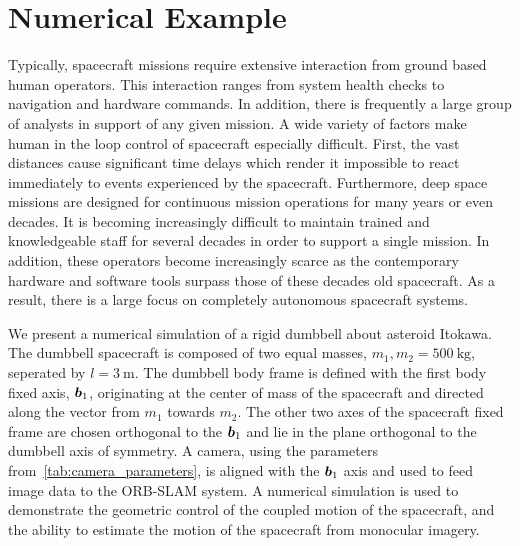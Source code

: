 \section{Numerical Example}

Typically, spacecraft missions require extensive interaction from ground based human operators. 
This interaction ranges from system health checks to navigation and hardware commands.
In addition, there is frequently a large group of analysts in support of any given mission. 
A wide variety of factors make human in the loop control of spacecraft especially difficult.
First, the vast distances cause significant time delays which render it impossible to react immediately to events experienced by the spacecraft. 
Furthermore, deep space missions are designed for continuous mission operations for many years or even decades. 
It is becoming increasingly difficult to maintain trained and knowledgeable staff for several decades in order to support a single mission.
In addition, these operators become increasingly scarce as the contemporary hardware and software tools surpass those of these decades old spacecraft. 
As a result, there is a large focus on completely autonomous spacecraft systems.

We present a numerical simulation of a rigid dumbbell about asteroid Itokawa.
The dumbbell spacecraft is composed of two equal masses, \( m_1, m_2 = \SI{500}{\kilo\gram} \), seperated by \( l = \SI{3}{\meter} \).
The dumbbell body frame is defined with the first body fixed axis, \( \bm{b}_1 \), originating at the center of mass of the spacecraft and directed along the vector from \( m_1 \) towards \( m_2 \).
The other two axes of the spacecraft fixed frame are chosen orthogonal to the \( \bm{b}_1 \) and lie in the plane orthogonal to the dumbbell axis of symmetry. 
A camera, using the parameters from~\cref{tab:camera_parameters}, is aligned with the \( \bm{b}_1 \) axis and used to feed image data to the ORB-SLAM system.
A numerical simulation is used to demonstrate the geometric control of the coupled motion of the spacecraft, and the ability to estimate the motion of the spacecraft from monocular imagery.

